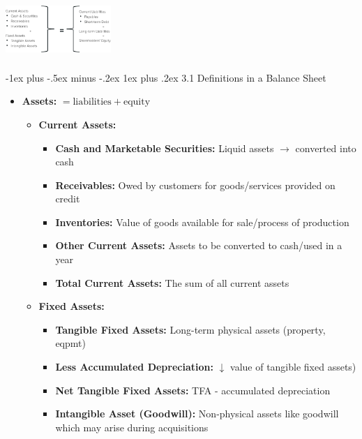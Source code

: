 \documentclass[10pt,landscape]{article}
\makeatletter
\newcommand{\subsubsubsection}{\@startsection{subsubsection}{3}{0mm}%
                                {-1ex plus -.5ex minus -.2ex}%
                                {1ex plus .2ex}%
                                {\normalfont\scriptsize\bfseries}}
\makeatother
\begin{document}
\begin{multicols*}{3}
\begin{multicols}{2}
    \vspace*{-32pt}
    \includegraphics*[width=4cm, height=2.2cm]{images/balancesheet.PNG}
\end{multicols}


\subsubsubsection{3.1 Definitions in a Balance Sheet}
\begin{itemize}[topsep=0pt,noitemsep,wide=0pt, leftmargin=\dimexpr{} + 2\relax]
    \item \textbf{Assets:} $= \text{liabilities} + \text{equity}$
    \begin{itemize}[topsep=0pt,noitemsep,wide=0pt, leftmargin=\dimexpr{} + 2\relax]
        \item \textbf{Current Assets:}
        \begin{itemize}[topsep=0pt,noitemsep,wide=0pt, leftmargin=\dimexpr{} + 2\relax]
            \item \textbf{Cash and Marketable Securities:} Liquid assets $\rightarrow$ converted into cash
            \item \textbf{Receivables:} Owed by customers for goods/services provided on credit
            \item \textbf{Inventories:} Value of goods available for sale/process of production
            \item \textbf{Other Current Assets:} Assets to be converted to cash/used in a year
            \item \textbf{Total Current Assets:} The sum of all current assets
        \end{itemize}
        \item \textbf{Fixed Assets:}
        \begin{itemize}[topsep=0pt,noitemsep,wide=0pt, leftmargin=\dimexpr{} + 2\relax]
            \item \textbf{Tangible Fixed Assets:} Long-term physical assets (property, eqpmt)
            \item \textbf{Less Accumulated Depreciation:} $\downarrow$ value of tangible fixed assets)
            \item \textbf{Net Tangible Fixed Assets:} TFA - accumulated depreciation
            \item \textbf{Intangible Asset (Goodwill):} Non-physical assets like goodwill which may arise during acquisitions

\end{itemize}
\end{itemize}
\end{itemize}
\end{multicols*}
\end{document}
